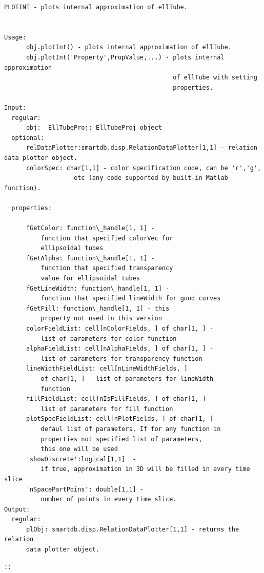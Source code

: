 \documentclass[letterpaper,10pt,english]{sphinxmanual}
\begin{document}
\begin{Verbatim}[commandchars=\\\{\}]
PLOTINT - plots internal approximation of ellTube.


Usage:
      obj.plotInt() - plots internal approximation of ellTube.
      obj.plotInt('Property',PropValue,...) - plots internal approximation
                                              of ellTube with setting
                                              properties.

Input:
  regular:
      obj:  EllTubeProj: EllTubeProj object
  optional:
      relDataPlotter:smartdb.disp.RelationDataPlotter[1,1] - relation data plotter object.
      colorSpec: char[1,1] - color specification code, can be 'r','g',
                   etc (any code supported by built-in Matlab function).

  properties:

      fGetColor: function\_handle[1, 1] -
          function that specified colorVec for
          ellipsoidal tubes
      fGetAlpha: function\_handle[1, 1] -
          function that specified transparency
          value for ellipsoidal tubes
      fGetLineWidth: function\_handle[1, 1] -
          function that specified lineWidth for good curves
      fGetFill: function\_handle[1, 1] - this
          property not used in this version
      colorFieldList: cell[nColorFields, ] of char[1, ] -
          list of parameters for color function
      alphaFieldList: cell[nAlphaFields, ] of char[1, ] -
          list of parameters for transparency function
      lineWidthFieldList: cell[nLineWidthFields, ]
          of char[1, ] - list of parameters for lineWidth
          function
      fillFieldList: cell[nIsFillFields, ] of char[1, ] -
          list of parameters for fill function
      plotSpecFieldList: cell[nPlotFields, ] of char[1, ] -
          defaul list of parameters. If for any function in
          properties not specified list of parameters,
          this one will be used
      'showDiscrete':logical[1,1]  -
          if true, approximation in 3D will be filled in every time slice
      'nSpacePartPoins': double[1,1] -
          number of points in every time slice.
Output:
  regular:
      plObj: smartdb.disp.RelationDataPlotter[1,1] - returns the relation
      data plotter object.
\end{Verbatim}

\begin{Verbatim}[commandchars=\\\{\}]
::
\end{Verbatim}
\end{document}
